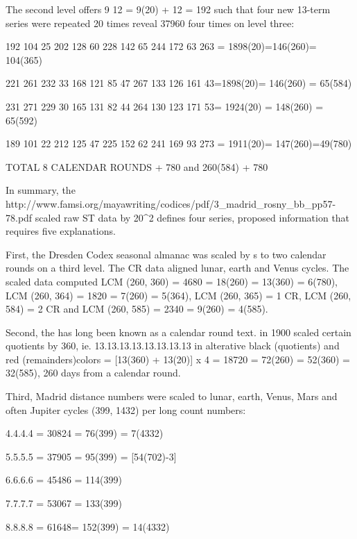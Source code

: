 \documentclass[12pt]{article}
\begin{document}
The second level offers 9 12 = 9(20) + 12 = 192 such that  four new 13-term series were repeated 20 times reveal 37960 four times  on level three:

192 104 25 202 128 60 228 142 65 244 172 63 263 = 1898(20)=146(260)= 104(365)

221 261 232 33 168 121 85 47 267 133 126 161 43=1898(20)= 146(260) = 65(584)

231 271 229 30 165 131 82 44 264 130 123  171 53= 1924(20) = 148(260) = 65(592)

189 101 22 212 125 47 225 152 62 241 169 93 273 = 1911(20)= 147(260)=49(780)

        TOTAL                 8 CALENDAR ROUNDS + 780 and              260(584) + 780
 
In summary, the  {http://www.famsi.org/mayawriting/codices/pdf/3_madrid_rosny_bb_pp57-78.pdf} scaled raw ST data by 20^2 defines four series, proposed information that requires five explanations. 

First, the Dresden Codex seasonal almanac was scaled by s to two calendar rounds on a third level. The CR data aligned lunar, earth and Venus cycles. The scaled data computed LCM (260, 360) = 4680 = 18(260) = 13(360) = 6(780), LCM (260, 364) = 1820 = 7(260) = 5(364), LCM (260, 365) = 1 CR, LCM (260, 584) = 2 CR and LCM (260, 585) = 2340 = 9(260) = 4(585).


Second, the  has long been known as a calendar round text.  in 1900 scaled certain quotients by 360, ie. 13.13.13.13.13.13.13.13 in alterative black (quotients) and red (remainders)colors = [13(360) + 13(20)] x 4 = 18720 = 72(260) = 52(360) = 32(585), 260 days from a calendar round.  

Third,  Madrid distance numbers were scaled to lunar, earth, Venus, Mars and often Jupiter cycles (399, 1432) per long count numbers:

4.4.4.4 =  30824 = 76(399) = 7(4332)

5.5.5.5 = 37905 = 95(399) = [54(702)-3]

6.6.6.6 =  45486 = 114(399) 

7.7.7.7 = 53067 = 133(399)

8.8.8.8 =  61648= 152(399) = 14(4332)
\end{document}
